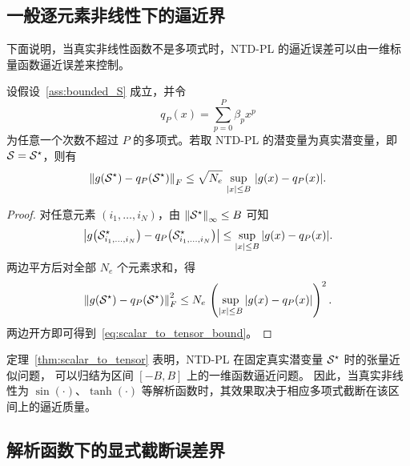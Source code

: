 \subsection{一般逐元素非线性下的逼近界}

下面说明，当真实非线性函数不是多项式时，NTD-PL 的逼近误差可以由一维标量函数逼近误差来控制。

\begin{theorem}[由标量函数逼近诱导的张量逼近界]
\label{thm:scalar_to_tensor}
设假设~\ref{ass:bounded_S} 成立，并令
\begin{equation}
q_P(x)=\sum_{p=0}^{P}\beta_p x^p
\end{equation}
为任意一个次数不超过 $P$ 的多项式。若取 NTD-PL 的潜变量为真实潜变量，即 $\mathcal{S}=\mathcal{S}^\star$，则有
\begin{equation}
\left\lVert 
g(\mathcal{S}^\star)-q_P(\mathcal{S}^\star)
 \right\rVert_F
\le
\sqrt{N_e}\,
\sup_{|x|\le B}\,
|g(x)-q_P(x)|.
\label{eq:scalar_to_tensor_bound}
\end{equation}
\end{theorem}

\begin{proof}
对任意元素 $(i_1,\dots,i_N)$，由 $\left\lVert \mathcal{S}^\star \right\rVert_\infty\le B$ 可知
\begin{equation}
\left|
g\!\left(\mathcal{S}^\star_{i_1,\dots,i_N}\right)
-
q_P\!\left(\mathcal{S}^\star_{i_1,\dots,i_N}\right)
\right|
\le
\sup_{|x|\le B}|g(x)-q_P(x)|.
\end{equation}
两边平方后对全部 $N_e$ 个元素求和，得
\begin{equation}
\left\lVert 
g(\mathcal{S}^\star)-q_P(\mathcal{S}^\star)
 \right\rVert_F^2
\le
N_e\,
\left(
\sup_{|x|\le B}|g(x)-q_P(x)|
\right)^2.
\end{equation}
两边开方即可得到~\eqref{eq:scalar_to_tensor_bound}。
\end{proof}

\begin{remark}
定理~\ref{thm:scalar_to_tensor} 表明，NTD-PL 在固定真实潜变量 $\mathcal{S}^\star$ 时的张量近似问题，
可以归结为区间 $[-B,B]$ 上的一维函数逼近问题。
因此，当真实非线性为 $\sin(\cdot)$、$\tanh(\cdot)$ 等解析函数时，其效果取决于相应多项式截断在该区间上的逼近质量。
\end{remark}

\subsection{解析函数下的显式截断误差界}

